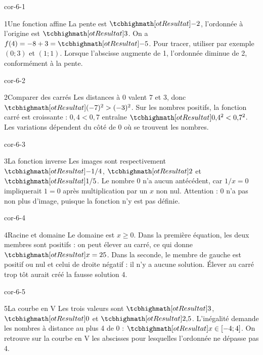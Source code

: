 \clearpage\pagestyle{otMain}\fontsize{11}{15}\selectfont
{}
\begin{blocLivre}{cor-6-1}
\begin{corrige}{1}{Une fonction affine}
La pente est $\res{-2}$, l’ordonnée à l’origine est $\res3$. On a $f(4)=-8+3=\res{-5}$. Pour tracer, utiliser par exemple $(0;3)$ et $(1;1)$. Lorsque l’abscisse augmente de 1, l’ordonnée diminue de 2, conformément à la pente.
\label{fig-cor-6-1}
\end{corrige}
\end{blocLivre}
\begin{blocLivre}{cor-6-2}
\begin{corrige}{2}{Comparer des carrés}
Les distances à 0 valent 7 et 3, donc $\res{(-7)^2>(-3)^2}$. Sur les nombres positifs, la fonction carré est croissante : $0{,}4<0{,}7$ entraîne $\res{0{,}4^2<0{,}7^2}$. Les variations dépendent du côté de 0 où se trouvent les nombres.
\end{corrige}
\end{blocLivre}
\begin{blocLivre}{cor-6-3}
\begin{corrige}{3}{La fonction inverse}
Les images sont respectivement $\res{-1/4}$, $\res2$ et $\res{1/5}$. Le nombre 0 n’a aucun antécédent, car $1/x=0$ impliquerait $1=0$ après multiplication par un $x$ non nul. Attention : 0 n’a pas non plus d’image, puisque la fonction n’y est pas définie.
\label{fig-cor-6-3}
\end{corrige}
\end{blocLivre}
\begin{blocLivre}{cor-6-4}
\begin{corrige}{4}{Racine et domaine}
Le domaine est $x\ge0$. Dans la première équation, les deux membres sont positifs : on peut élever au carré, ce qui donne $\res{x=25}$. Dans la seconde, le membre de gauche est positif ou nul et celui de droite négatif : il n’y a aucune solution. Élever au carré trop tôt aurait créé la fausse solution 4.
\label{fig-cor-6-4}
\end{corrige}
\end{blocLivre}
\begin{blocLivre}{cor-6-5}
\begin{corrige}{5}{La courbe en V}
Les trois valeurs sont $\res3$, $\res0$ et $\res{2{,}5}$. L’inégalité demande les nombres à distance au plus 4 de 0 : $\res{x\in[-4;4]}$. On retrouve sur la courbe en V les abscisses pour lesquelles l’ordonnée ne dépasse pas 4.
\label{fig-cor-6-5}
\end{corrige}
\end{blocLivre}
